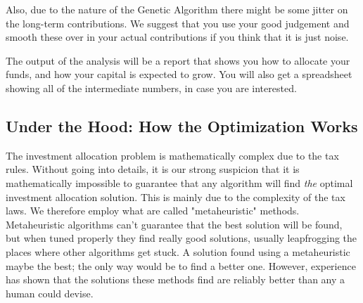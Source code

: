 \documentclass[a4paper, justified]{tufte-handout}
\begin{document}
Also, due to the nature of the Genetic Algorithm there might be some jitter on the long-term contributions. We suggest that you use your good judgement and smooth these over in your actual contributions if you think that it is just noise.

The output of the analysis will be a report that shows you how to allocate your funds, and how your capital is expected to grow. You will also get a spreadsheet showing all of the intermediate numbers, in case you are interested.

\subsection{Under the Hood: How the Optimization Works}

The investment allocation problem is mathematically complex due to the tax rules. Without going into details, it is our strong suspicion that it is mathematically impossible to guarantee that any algorithm will find \textit{the} optimal investment allocation solution. This is mainly due to the complexity of the tax laws. We therefore employ what are called "metaheuristic" methods. Metaheuristic algorithms can't guarantee that the best solution will be found, but when tuned properly they find really good solutions, usually leapfrogging the places where other algorithms get stuck. A solution found using a metaheuristic maybe the best; the only way would be to find a better one. However, experience has shown that the solutions these methods find are reliably better than any a human could devise.
\end{document}

